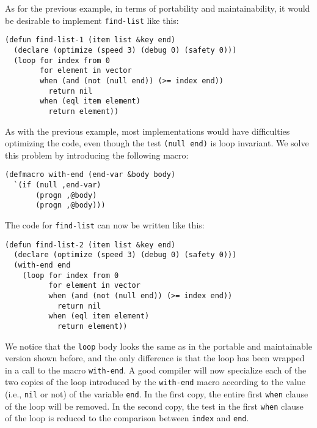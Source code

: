 As for the previous example, in terms of portability and
maintainability, it would be desirable to implement
\texttt{find-list} like this:

{\small\begin{verbatim}
(defun find-list-1 (item list &key end)
  (declare (optimize (speed 3) (debug 0) (safety 0)))
  (loop for index from 0
        for element in vector
        when (and (not (null end)) (>= index end))
          return nil
        when (eql item element)
          return element))
\end{verbatim}}

As with the previous example, most \commonlisp{} implementations would
have difficulties optimizing the code, even though the test
\texttt{(null end)} is loop invariant.  We solve this problem by
introducing the following macro:

{\small\begin{verbatim}
(defmacro with-end (end-var &body body)
  `(if (null ,end-var)
       (progn ,@body)
       (progn ,@body)))
\end{verbatim}}

The code for \texttt{find-list} can now be written like this:

{\small\begin{verbatim}
(defun find-list-2 (item list &key end)
  (declare (optimize (speed 3) (debug 0) (safety 0)))
  (with-end end
    (loop for index from 0
          for element in vector
          when (and (not (null end)) (>= index end))
            return nil
          when (eql item element)
            return element))
\end{verbatim}}

We notice that the \texttt{loop} body looks the same as in the
portable and maintainable version shown before, and the only
difference is that the loop has been wrapped in a call to the macro
\texttt{with-end}.  A good compiler will now specialize each of the
two copies of the loop introduced by the \texttt{with-end} macro
according to the value (i.e., \texttt{nil} or not) of the variable
\texttt{end}.  In the first copy, the entire first \texttt{when}
clause of the loop will be removed.  In the second copy, the test in
the first \texttt{when} clause of the loop is reduced to the
comparison between \texttt{index} and \texttt{end}.
